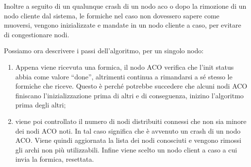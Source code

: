 Inoltre a seguito di un qualunque crash di un nodo aco o dopo la rimozione di un nodo cliente dal sistema, le formiche nel caso non dovessero sapere come muoversi, vengono inizializzate e mandate in un nodo cliente a caso, per evitare di congestionare nodi.

Possiamo ora descrivere i passi dell'algoritmo, per un singolo nodo:
\begin{enumerate} 
    \item Appena viene ricevuta una formica, il nodo ACO verifica che l'init status abbia come valore ``done'', altrimenti continua a rimandarsi a sé stesso le formiche che riceve. Questo è perché potrebbe succedere che alcuni nodi ACO finiscano l'inizializzazione prima di altri e di conseguenza, inizino l'algoritmo prima degli altri;
    \item viene poi controllato il numero di nodi distribuiti connessi che non sia minore dei nodi ACO noti. 
    In tal caso significa che è avvenuto un crash di un nodo ACO. Viene quindi aggiornata la lista dei nodi conosciuti e vengono rimossi gli archi non più utilizzabili. Infine viene scelto un nodo client a caso a cui invia la formica, resettata. 
    

\end{enumerate}
